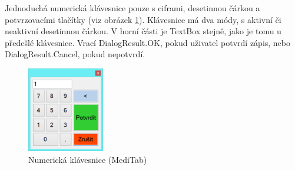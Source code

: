 Jednoduchá numerická klávesnice pouze s ciframi, desetinnou čárkou a potvrzovacími tlačítky (viz obrázek \ref{fig:keyboard_num}). Klávesnice má dva módy, s aktivní či neaktivní desetinnou čárkou. V horní části je TextBox stejně, jako je tomu u předešlé klávesnice. Vrací DialogResult.OK, pokud uživatel potvrdí zápis, nebo DialogResult.Cancel, pokud nepotvrdí.

\begin{figure}[H]
	\centering
	\includegraphics[width=0.3\textwidth]{img/meditab/keyboard_numeric.eps}
	\caption{Numerická klávesnice (MediTab)}
  \label{fig:keyboard_num}
\end{figure}